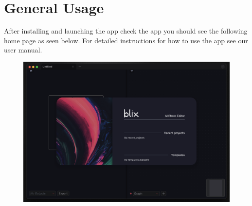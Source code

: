 \documentclass[11pt,a4paper]{article}
\begin{document}
\section*{General Usage}

After installing and launching the app check the app you should see the
following home page as seen below. For detailed instructions for how to use the
app see our user manual.

\begin{figure}[ht]
	\centering
	\includegraphics[width=1\textwidth,height=\textheight,keepaspectratio,rotate=0,origin=c]{../pics/blix-homepage.png}
\end{figure}
\end{document}

